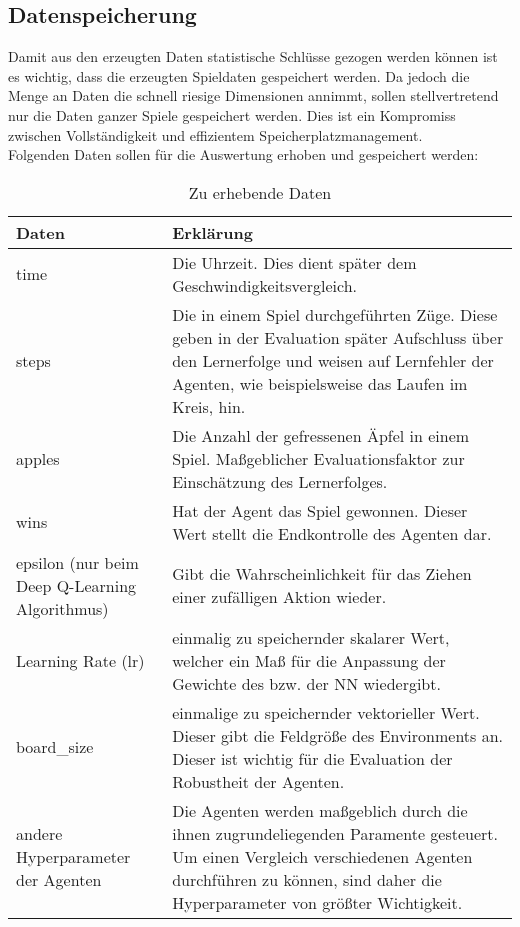 \subsection{Datenspeicherung}
Damit aus den erzeugten Daten statistische Schlüsse gezogen werden können ist es wichtig, dass die erzeugten Spieldaten gespeichert werden. Da jedoch die Menge an Daten die schnell riesige Dimensionen annimmt, sollen stellvertretend nur die Daten ganzer Spiele gespeichert werden. Dies ist ein Kompromiss zwischen Vollständigkeit und effizientem Speicherplatzmanagement.\\
Folgenden Daten sollen für die Auswertung erhoben und gespeichert werden:
\begin{longtable}[h]{|p{4cm}|p{\linewidth - 5cm}|}
	\caption{Zu erhebende Daten}
	\label{tab:Datenerhebung} 
	\endfirsthead
	\endhead
	\hline
	Daten & Erklärung \\
	\hline
	time & Die Uhrzeit. Dies dient später dem Geschwindigkeitsvergleich. \\
	\hline
	steps & Die in einem Spiel durchgeführten Züge. Diese geben in der Evaluation später Aufschluss über den Lernerfolge und weisen auf Lernfehler der Agenten, wie beispielsweise das Laufen im Kreis, hin. \\
	\hline
	apples & Die Anzahl der gefressenen Äpfel in einem Spiel. Maßgeblicher Evaluationsfaktor zur Einschätzung des Lernerfolges. \\
	\hline
	wins & Hat der Agent das Spiel gewonnen. Dieser Wert stellt die Endkontrolle des Agenten dar. \\
	\hline
	epsilon (nur beim Deep Q-Learning Algorithmus) & Gibt die Wahrscheinlichkeit für das Ziehen einer zufälligen Aktion wieder.  \\
	\hline
	Learning Rate (lr) & einmalig zu speichernder skalarer Wert, welcher ein Maß für die Anpassung der Gewichte des bzw. der NN wiedergibt. \\
	\hline
	board\_size &  einmalige zu speichernder vektorieller Wert. Dieser gibt die Feldgröße des Environments an. Dieser ist wichtig für die Evaluation der Robustheit der Agenten. \\
	\hline
	andere Hyperparameter der Agenten & Die Agenten werden maßgeblich durch die ihnen zugrundeliegenden Paramente gesteuert. Um einen Vergleich verschiedenen Agenten durchführen zu können, sind daher die Hyperparameter von größter Wichtigkeit. \\
	\hline
\end{longtable}


